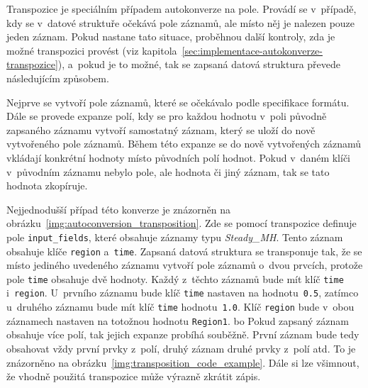 \documentclass[FM,bw,DP]{tulthesis}
\begin{document}
Transpozice je speciálním případem autokonverze na pole. Provádí se v~případě, kdy se v~datové struktuře očekává pole záznamů, ale místo něj je nalezen pouze jeden záznam. Pokud nastane tato situace, proběhnou další kontroly, zda je možné transpozici provést (viz kapitola~\ref{sec:implementace-autokonverze-transpozice}), a~pokud je to možné, tak se zapsaná datová struktura převede následujícím způsobem.

Nejprve se vytvoří pole záznamů, které se očekávalo podle specifikace formátu. Dále se provede expanze polí, kdy se pro každou hodnotu v~poli původně zapsaného záznamu vytvoří samostatný záznam, který se uloží do nově vytvořeného pole záznamů. Během této expanze se do nově vytvořených záznamů vkládají kon\-krétní hodnoty místo původních polí hodnot. Pokud v~daném klíči v~původním záznamu nebylo pole, ale hodnota či jiný záznam, tak se tato hodnota zkopíruje.

Nejjednodušší případ této konverze je znázorněn na obrázku~\ref{img:autoconversion_transposition}. Zde se pomocí transpozice definuje pole \texttt{input\_fields}, které obsahuje záznamy typu \textit{Steady\_MH}. Tento záznam obsahuje klíče \texttt{region} a~\texttt{time}. Zapsaná datová struktura se transponuje tak, že se místo jediného uvedeného záznamu vytvoří pole záznamů o~dvou prvcích, protože pole \texttt{time} obsahuje dvě hodnoty. Každý z~těchto záznamů bude mít klíč \texttt{time} i~\texttt{region}. U~prvního záznamu bude klíč \texttt{time} nastaven na hodnotu~\texttt{0.5}, zatímco u~druhého záznamu bude mít klíč \texttt{time} hodnotu~\texttt{1.0}. Klíč \texttt{region} bude v~obou záznamech nastaven na totožnou hodnotu \texttt{Region1}.
bo
Pokud zapsaný záznam obsahuje více polí, tak jejich expanze probíhá souběžně. První záznam bude tedy obsahovat vždy první prvky z~polí, druhý záznam druhé prvky z~polí atd. To je znázorněno na obrázku~\ref{img:transposition_code_example}. Dále si lze všimnout, že vhodně použitá transpozice může výrazně zkrátit zápis.

\lstset{style=code}
\end{document}
